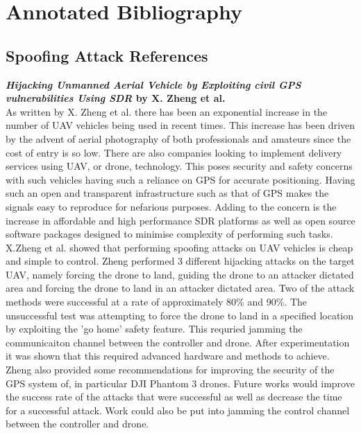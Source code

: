 \section{Annotated Bibliography}
\subsection{Spoofing Attack References}

\textbf{\emph{Hijacking Unmanned Aerial Vehicle by Exploiting civil GPS vulnerabilities Using SDR} by X. Zheng et al.}\\
As written by X. Zheng et al. \cite{RN4} there has been an exponential increase in the number of UAV vehicles being used in recent times.
This increase has been driven by the advent of aerial photography of both professionals and amateurs since the cost of entry is so low. There are
also companies looking to implement delivery services using UAV, or drone, technology.
This poses security and safety concerns with such vehicles having such a reliance on GPS for accurate positioning. Having such an open and transparent
infrastructure such as that of GPS makes the signals easy to reproduce for nefarious purposes. Adding to the concern is the increase in 
affordable and high performance SDR platforms as well as open source software packages designed to minimise complexity of performing such tasks. X.Zheng et al.
showed that performing spoofing attacks on UAV vehicles is cheap and simple to control. Zheng performed 3 different hijacking attacks on the target
UAV, namely forcing the drone to land, guiding the drone to an attacker dictated area and forcing the drone to land in an attacker dictated area.
Two of the attack methods were successful at a rate of approximately 80\% and 90\%. The unsuccessful test was attempting to force the drone to land in a specified location by exploiting the 
'go home' safety feature. This requried jamming the communicaiton channel between the controller and drone. After experimentation it was shown
that this required advanced hardware and methods to achieve. Zheng also provided some recommendations for improving the security of the GPS system of, in particular
DJI Phantom 3 drones.
Future works would improve the success rate of the attacks that were successful as well as decrease the time for a successful attack. Work could 
also be put into jamming the control channel between the controller and drone.

\medskip

